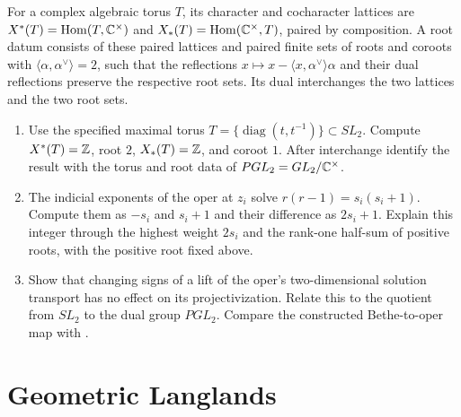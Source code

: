 \begin{exercise}
For a complex algebraic torus $T$, its character and cocharacter
lattices are $X^*(T)=\operatorname{Hom}(T,\mathbb C^\times)$ and
$X_*(T)=\operatorname{Hom}(\mathbb C^\times,T)$, paired by composition.
A root datum consists of these paired lattices and paired finite
sets of roots and coroots with $\langle\alpha,\alpha^\vee\rangle=2$,
such that the reflections
$x\mapsto x-\langle x,\alpha^\vee\rangle\alpha$ and their
dual reflections preserve the respective root sets.
Its dual interchanges the two lattices and the two root sets.
\begin{enumerate}[label=(\alph*)]
\item Use the specified maximal torus
$T=\{\operatorname{diag}(t,t^{-1})\}\subset SL_2$.
Compute $X^*(T)=\mathbb Z$, root $2$, $X_*(T)=\mathbb Z$, and coroot $1$.
After interchange identify the result with the torus and root
data of $PGL_2=GL_2/\mathbb C^\times$.
\item The indicial exponents of the oper at $z_i$ solve
$r(r-1)=s_i(s_i+1)$. Compute them as $-s_i$ and $s_i+1$
and their difference as $2s_i+1$. Explain this integer
through the highest weight $2s_i$ and the rank-one
half-sum of positive roots, with the positive root fixed above.
\item Show that changing signs of a lift of the oper's
two-dimensional solution transport has no effect on its
projectivization. Relate this to the quotient from $SL_2$
to the dual group $PGL_2$.
Compare the constructed Bethe-to-oper map with \cite{frenkel-opers}.
\end{enumerate}
\end{exercise}

\section{Geometric Langlands}

